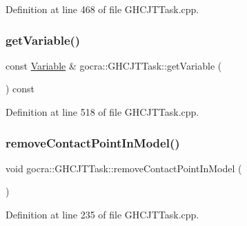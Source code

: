 Definition at line 468 of file G\+H\+C\+J\+T\+Task.\+cpp.

\hypertarget{classgocra_1_1GHCJTTask_a9ba33bc965fe2d39a7758bca2d41005a}{}\label{classgocra_1_1GHCJTTask_a9ba33bc965fe2d39a7758bca2d41005a} 
\subsubsection{\texorpdfstring{get\+Variable()}{getVariable()}}
{\footnotesize\ttfamily const \hyperlink{classocra_1_1Variable}{Variable} \& gocra\+::\+G\+H\+C\+J\+T\+Task\+::get\+Variable (\begin{DoxyParamCaption}{ }\end{DoxyParamCaption}) const}



Definition at line 518 of file G\+H\+C\+J\+T\+Task.\+cpp.

\hypertarget{classgocra_1_1GHCJTTask_a818c6077d8325b963e3c72e41a03fe86}{}\label{classgocra_1_1GHCJTTask_a818c6077d8325b963e3c72e41a03fe86} 
\subsubsection{\texorpdfstring{remove\+Contact\+Point\+In\+Model()}{removeContactPointInModel()}}
{\footnotesize\ttfamily void gocra\+::\+G\+H\+C\+J\+T\+Task\+::remove\+Contact\+Point\+In\+Model (\begin{DoxyParamCaption}{ }\end{DoxyParamCaption})\hspace{0.3cm}{\ttfamily [protected]}}



Definition at line 235 of file G\+H\+C\+J\+T\+Task.\+cpp.

\hypertarget{classgocra_1_1GHCJTTask_adb7d719214756cc13927b3587b4e6219}{}\label{classgocra_1_1GHCJTTask_adb7d719214756cc13927b3587b4e6219} 
